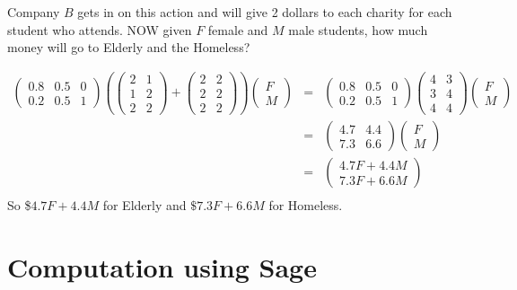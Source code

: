 \begin{example}
Company $B$ gets in on this action and will give 2 dollars to each charity for each student who attends.  NOW given $F$ female and $M$ male students, how much money will go to Elderly and the Homeless?

\begin{eqnarray*}
\begin{pmatrix} 0.8 & 0.5 & 0 \\ 0.2 & 0.5 & 1 \end{pmatrix} \left( \begin{pmatrix} 2 & 1 \\ 1 & 2 \\ 2 & 2\end{pmatrix} + \begin{pmatrix} 2 & 2 \\ 2 & 2 \\ 2 & 2\end{pmatrix}   \right)\begin{pmatrix} F\\M \end{pmatrix}&=&\begin{pmatrix} 0.8 & 0.5 & 0 \\ 0.2 & 0.5 & 1 \end{pmatrix} \begin{pmatrix} 4 & 3 \\ 3 & 4 \\ 4 & 4\end{pmatrix} \begin{pmatrix} F\\M \end{pmatrix}\\
&=&\begin{pmatrix} 4.7 & 4.4 \\ 7.3 &  6.6 \end{pmatrix}\begin{pmatrix} F\\M \end{pmatrix}\\
&=&\begin{pmatrix} 4.7F+4.4M\\ 7.3F+6.6M \end{pmatrix}\\
\end{eqnarray*}
So \$$4.7 F+4.4M$ for Elderly and $\$7.3 F+6.6M$ for Homeless.
\end{example}

\section{Computation using Sage}\label{Section:MatrixSage}

